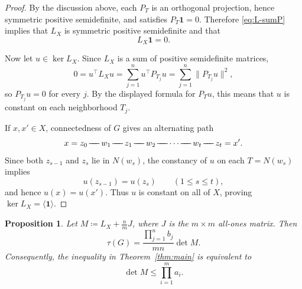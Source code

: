 \documentclass[twoside, reqno]{amsart}
\def\adj{\mathrel{\!\mathrel-\mkern-8mu\mathrel-\mkern-8mu\mathrel-\!}}
\newtheorem{proposition}[theorem]{Proposition}
\theoremstyle{definition}
\theoremstyle{remark}
\begin{document}
\begin{proof}
By the discussion above, each $P_T$ is an orthogonal projection, hence symmetric positive semidefinite, and satisfies $P_T\mathbf1=0$. Therefore \eqref{eq:L-sumP} implies that $L_X$ is symmetric positive semidefinite and that
\[
L_X\mathbf1=0.
\]

Now let $u\in\ker L_X$. Since $L_X$ is a sum of positive semidefinite matrices,
\[
0=u^{\top}L_Xu=\sum_{j=1}^n u^{\top}P_{T_j}u=\sum_{j=1}^n \|P_{T_j}u\|^2,
\]
so $P_{T_j}u=0$ for every $j$. By the displayed formula for $P_Tu$, this means that $u$ is constant on each neighborhood $T_j$.

If $x,x'\in X$, connectedness of $G$ gives an alternating path
\[
x=z_0\adj w_1\adj z_1\adj w_2\adj\cdots\adj w_t\adj z_t=x'.
\]
Since both $z_{s-1}$ and $z_s$ lie in $N(w_s)$, the constancy of 
$u$ on each $T=N(w_s)$ implies
\[
u(z_{s-1})=u(z_s)\qquad (1\le s\le t),
\]
and hence $u(x)=u(x')$. Thus $u$ is constant on all of $X$, 
proving $\ker L_X=\langle \mathbf1\rangle$.
\end{proof}

\begin{proposition}\label{prop:reduction}
Let $M\coloneqq L_X+\frac{n}{m}J$, where $J$ is the $m\times m$ all-ones matrix. Then
\begin{equation}\label{eq:tau-detM}
\tau(G)=\frac{\prod_{j=1}^n b_j}{mn}\det M.
\end{equation}
Consequently, the inequality in Theorem~\ref{thm:main} is equivalent to
\begin{equation}\label{eq:det-bound}
\det M\le \prod_{i=1}^m a_i.
\end{equation}
\end{proposition}
\end{document}
